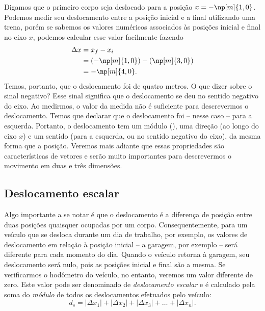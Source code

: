Digamos que o primeiro corpo seja deslocado para a posição $x = - \np[m]{1,0}$. Podemos medir seu deslocamento entre a posição inicial e a final utilizando uma trena, porém se sabemos os valores numéricos associados às posições inicial e final no eixo $x$, podemos calcular esse valor facilmente fazendo
\begin{align}
  \Delta x &= x_f - x_i \\
  &= (-\np[m]{1,0}) - (\np[m]{3,0}) \\
  &= -\np[m]{4,0}.
\end{align}
%
Temos, portanto, que o deslocamento foi de quatro metros. O que dizer sobre o sinal negativo? Esse sinal significa que o deslocamento se deu no sentido negativo do eixo. Ao medirmos, o valor da medida não é suficiente para descrevermos o deslocamento. Temos que declarar que o deslocamento foi -- nesse caso -- para a esquerda. Portanto, o deslocamento tem um módulo (), uma direção (ao longo do eixo $x$) e um sentido (para a esquerda, ou no sentido negativo do eixo), da mesma forma que a posição. Veremos mais adiante que essas propriedades são características de vetores e serão muito importantes para descrevermos o movimento em duas e três dimensões.


\subsection{Deslocamento escalar}

Algo importante a se notar é que o deslocamento é a diferença de posição entre duas posições quaisquer ocupadas por um corpo. Consequentemente, para um veículo que se desloca durante um dia de trabalho, por exemplo, os valores de deslocamento em relação à posição inicial -- a garagem, por exemplo -- será diferente para cada momento do dia. Quando o veículo retorna à garagem, seu deslocamento será nulo, pois as posições inicial e final são a mesma. Se verificarmos o hodômetro do veículo, no entanto, veremos um valor diferente de zero. Este valor pode ser denominado de \emph{deslocamento escalar} e é calculado pela soma do \emph{módulo} de todos os deslocamentos efetuados pelo veículo:
\begin{equation}
  d_s = |\Delta x_1| + |\Delta x_2| + |\Delta x_3| + \dots + |\Delta x_n|.
\end{equation}

